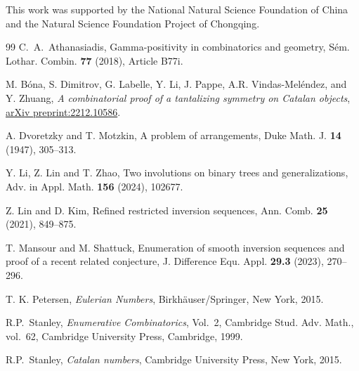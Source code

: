 \documentclass[reqno]{amsart}
\numberwithin{equation}{section}
\theoremstyle{definition}
\theoremstyle{named}
\begin{document}
This work was supported by the National Natural Science Foundation of China and the Natural Science Foundation Project of Chongqing.


\begin{thebibliography}{99}
	C.~A.~Athanasiadis, Gamma-positivity in combinatorics and geometry, S\'{e}m. Lothar. Combin. {\bf 77} (2018), Article B77i.

	M. B\'ona, S. Dimitrov, G. Labelle, Y. Li, J. Pappe, A.R. Vindas-Mel\'endez, and Y. Zhuang, {\it A combinatorial proof of a tantalizing symmetry on Catalan objects}, \href{https://arxiv.org/abs/2212.10586}{arXiv preprint:2212.10586}.

	A. Dvoretzky and T. Motzkin, A problem of arrangements, Duke Math. J. {\bf 14} (1947), 305--313.
	
	 Y. Li, Z. Lin and T. Zhao, Two involutions on binary trees and generalizations, Adv. in Appl. Math. {\bf 156} (2024), 102677.

	Z. Lin and D. Kim, Refined restricted inversion sequences, Ann. Comb. {\bf 25} (2021), 849--875.
	
	T. Mansour and M. Shattuck, Enumeration of smooth inversion sequences and proof of a recent related conjecture, J. Difference Equ. Appl. {\bf 29.3} (2023), 270--296.
	
	T. K. Petersen, \textit{Eulerian Numbers}, Birkh\"auser/Springer, New York, 2015.
	
  R.P.~Stanley, \textit{Enumerative Combinatorics}, Vol.~2, Cambridge Stud. Adv. Math., vol.~62, Cambridge University Press, Cambridge, 1999.

  R.P.~Stanley, \textit{Catalan numbers}, Cambridge University Press, New York, 2015.
	
	
	
	

\end{thebibliography}
\end{document}
